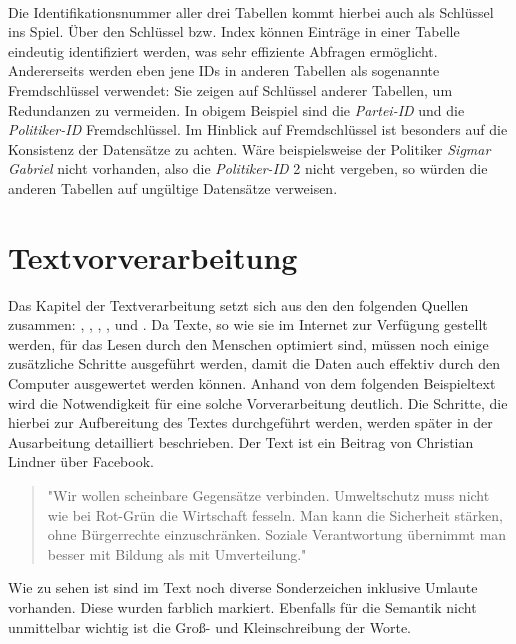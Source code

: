 \\
Die Identifikationsnummer aller drei Tabellen kommt hierbei auch als Schlüssel ins Spiel. Über den Schlüssel bzw. Index können Einträge in einer Tabelle eindeutig identifiziert werden, was sehr effiziente Abfragen ermöglicht. Andererseits werden eben jene IDs in anderen Tabellen als sogenannte Fremdschlüssel verwendet: Sie zeigen auf Schlüssel anderer Tabellen, um Redundanzen zu vermeiden. In obigem Beispiel sind die \textit{Partei-ID} und die \textit{Politiker-ID} Fremdschlüssel. Im Hinblick auf Fremdschlüssel ist besonders auf die Konsistenz der Datensätze zu achten. Wäre beispielsweise der Politiker \textit{Sigmar Gabriel} nicht vorhanden, also die \textit{Politiker-ID} 2 nicht vergeben, so würden die anderen Tabellen auf ungültige Datensätze verweisen.

\section{Textvorverarbeitung}
Das Kapitel der Textverarbeitung setzt sich aus den den folgenden Quellen zusammen: \cite{deutschinfo}, \cite{openthesaurus}, \cite{morphy}, \cite{wikipedia}, \cite{webmining} und \cite{zeichenkodierung}.
\newline
Da Texte, so wie sie im Internet zur Verfügung gestellt werden, für das Lesen durch den Menschen optimiert sind, müssen noch einige zusätzliche Schritte ausgeführt werden, damit die Daten auch effektiv durch den Computer ausgewertet werden können. Anhand von dem folgenden Beispieltext wird die Notwendigkeit für eine solche Vorverarbeitung deutlich. Die Schritte, die hierbei zur Aufbereitung des Textes durchgeführt werden, werden später in der Ausarbeitung detailliert beschrieben. Der Text ist ein Beitrag von Christian Lindner über Facebook.
\newline
\begin{quote}
\colorbox{rahmen}{"Wir} wollen scheinbare \colorbox{rahmen}{Gegensätze} verbinden\colorbox{rahmen}{. Umweltschutz} muss nicht wie bei \colorbox{rahmen}{Rot-Grün} die \colorbox{rahmen}{Wirtschaft} fesseln\colorbox{rahmen}{. Man} kann die \colorbox{rahmen}{Sicherheit stärken}, ohne \colorbox{rahmen}{Bürgerrechte einzuschränken. Soziale Verantwortung übernimmt} man besser mit \colorbox{rahmen}{Bildung} als mit \colorbox{rahmen}{Umverteilung.}"
\end{quote}

Wie zu sehen ist sind im Text noch diverse Sonderzeichen inklusive Umlaute vorhanden. Diese wurden farblich markiert. Ebenfalls für die Semantik nicht unmittelbar wichtig ist die Groß- und Kleinschreibung der Worte.
\newline


